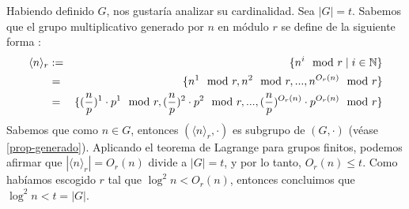 	Habiendo definido $G$, nos gustaría analizar su cardinalidad. Sea $|G| = t$. Sabemos que el grupo multiplicativo generado por $n$ en módulo $r$ se define de la siguiente forma :
	\begin{eqnarray}
		\langle n\rangle _r &:=& \{n^i\mod r \mid i\in \mathbb{N}\}\nonumber\\
		&=&\{n^1\mod r,n^2\mod r,...,n^{O_r(n)}\mod r \}\nonumber\\
		&=&\{(\frac{n}{p})^1\cdot p^1\mod r,(\frac{n}{p})^2\cdot p^2\mod r,...,(\frac{n}{p})^{O_r(n)}\cdot p^{O_r(n)}\mod r \}\nonumber
	\end{eqnarray}
Sabemos que como $n\in G$, entonces $(\langle n\rangle_r,\cdot)$ es subgrupo de $(G,\cdot)$	(véase \ref{prop-generado}).
	Aplicando el teorema de Lagrange para grupos finitos, podemos afirmar que $|\langle n\rangle _r| = O_r(n)$ divide a $|G|=t$, y por lo tanto, $O_r(n)\leq t$. Como habí­amos escogido $r$ tal que $\log ^2n <O_r(n)$, entonces concluimos que $\log ^2 n <t=|G|$.

